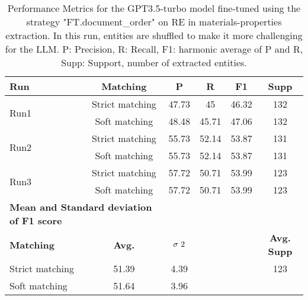 \begin{table}[htbp]
    \small
    \centering
    \caption{Performance Metrics for the GPT3.5-turbo model fine-tuned using the strategy "FT.document\_order" on RE in materials-properties extraction. In this run, entities are shuffled to make it more challenging for the LLM. P: Precision, R: Recall, F1: harmonic average of P and R, Supp: Support, number of extracted entities.}
    \begin{tabular}{lccccc}
        \toprule
        \textbf{Run} & \textbf{Matching} & \textbf{P} & \textbf{R} & \textbf{F1} & \textbf{Supp} \\
        \midrule
        \multirow{2}{*}{Run1}   & Strict matching   & 47.73 & 45 & 46.32 & 132 \\
                                & Soft matching     & 48.48 & 45.71  & 47.06 & 132 \\
        \midrule
        \multirow{2}{*}{Run2}   & Strict matching   & 55.73 & 52.14  & 53.87 & 131 \\
                                & Soft matching     & 55.73 & 52.14  & 53.87 & 131 \\
        \midrule
        \multirow{2}{*}{Run3}   & Strict matching   & 57.72 & 50.71  & 53.99 & 123 \\
                                & Soft matching     & 57.72 & 50.71  & 53.99 & 123 \\
        \midrule
        \multicolumn{2}{l}{\textbf{Mean and Standard deviation of F1 score}} & & & & \\
        \midrule
        \textbf{Matching} & \textbf{Avg.} & $\sigma\textsuperscript{2}$ & & &  \textbf{Avg. Supp}\\
        Strict matching & 51.39 & 4.39 & & & 123 \\
        Soft matching & 51.64 & 3.96 & & \\
        \bottomrule
    \end{tabular}
\end{table}


